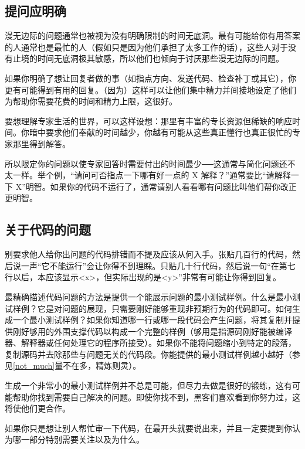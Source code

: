 \subsection{提问应明确}


漫无边际的问题通常也被视为没有明确限制的时间无底洞。最有可能给你有用答案的人通常也是最忙的人（假如只是因为他们承担了太多工作的话），这些人对于没有止境的时间无底洞极其敏感，所以他们也倾向于讨厌那些漫无边际的问题。

如果你明确了想让回复者做的事（如指点方向、发送代码、检查补丁或其它），你更有可能得到有用的回复。（因为）这样可以让他们集中精力并间接地设定了他们为帮助你需要花费的时间和精力上限，这很好。

要想理解专家生活的世界，可以这样设想：那里有丰富的专长资源但稀缺的响应时间。你暗中要求他们奉献的时间越少，你越有可能从这些真正懂行也真正很忙的专家那里得到解答。

所以限定你的问题以使专家回答时需要付出的时间最少──这通常与简化问题还不太一样。举个例，“请问可否指点一下哪有好一点的 X 解释？”通常要比“请解释一下 X”明智。如果你的代码不运行了，通常请别人看看哪有问题比叫他们帮你改正更明智。




\subsection{关于代码的问题}


别要求他人给你出问题的代码排错而不提及应该从何入手。张贴几百行的代码，然后说一声“它不能运行”会让你得不到理睬。只贴几十行代码，然后说一句“在第七行以后，本应该显示<x>，但实际出现的是<y>”非常有可能让你得到回复。

最精确描述代码问题的方法是提供一个能展示问题的最小测试样例。什么是最小测试样例？它是对问题的展现，只需要刚好能够重现非预期行为的代码即可。如何生成一个最小测试样例？如果你知道哪一行或哪一段代码会产生问题，将其复制并提供刚好够用的外围支撑代码以构成一个完整的样例（够用是指源码刚好能被编译器、解释器或任何处理它的程序所接受）。如果你不能将问题缩小到特定的段落，复制源码并去除那些与问题无关的代码段。你能提供的最小测试样例越小越好（参见\ref{not_much}{量不在多，精炼则灵}）。

生成一个非常小的最小测试样例并不总是可能，但尽力去做是很好的锻练，这有可能帮助你找到需要自己解决的问题。即使你找不到，黑客们喜欢看到你努力过，这将使他们更合作。

如果你只是想让别人帮忙审一下代码，在最开头就要说出来，并且一定要提到你认为哪一部分特别需要关注以及为什么。





